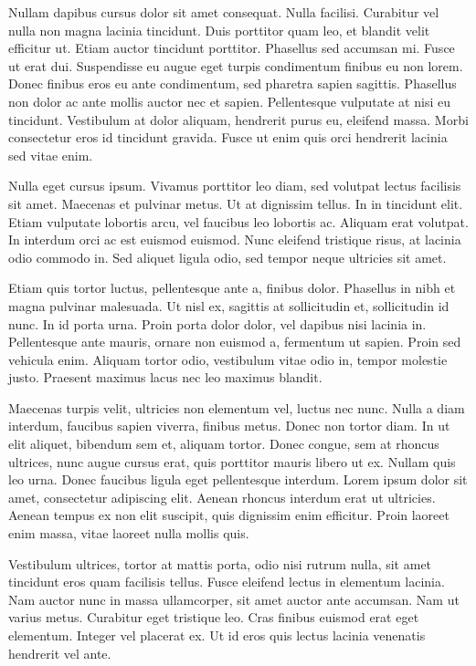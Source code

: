 \documentclass[
  letterpaper,
]{scrbook}
\begin{document}
Nullam dapibus cursus dolor sit amet consequat. Nulla facilisi.
Curabitur vel nulla non magna lacinia tincidunt. Duis porttitor quam
leo, et blandit velit efficitur ut. Etiam auctor tincidunt porttitor.
Phasellus sed accumsan mi. Fusce ut erat dui. Suspendisse eu augue eget
turpis condimentum finibus eu non lorem. Donec finibus eros eu ante
condimentum, sed pharetra sapien sagittis. Phasellus non dolor ac ante
mollis auctor nec et sapien. Pellentesque vulputate at nisi eu
tincidunt. Vestibulum at dolor aliquam, hendrerit purus eu, eleifend
massa. Morbi consectetur eros id tincidunt gravida. Fusce ut enim quis
orci hendrerit lacinia sed vitae enim.

Nulla eget cursus ipsum. Vivamus porttitor leo diam, sed volutpat lectus
facilisis sit amet. Maecenas et pulvinar metus. Ut at dignissim tellus.
In in tincidunt elit. Etiam vulputate lobortis arcu, vel faucibus leo
lobortis ac. Aliquam erat volutpat. In interdum orci ac est euismod
euismod. Nunc eleifend tristique risus, at lacinia odio commodo in. Sed
aliquet ligula odio, sed tempor neque ultricies sit amet.

Etiam quis tortor luctus, pellentesque ante a, finibus dolor. Phasellus
in nibh et magna pulvinar malesuada. Ut nisl ex, sagittis at
sollicitudin et, sollicitudin id nunc. In id porta urna. Proin porta
dolor dolor, vel dapibus nisi lacinia in. Pellentesque ante mauris,
ornare non euismod a, fermentum ut sapien. Proin sed vehicula enim.
Aliquam tortor odio, vestibulum vitae odio in, tempor molestie justo.
Praesent maximus lacus nec leo maximus blandit.

Maecenas turpis velit, ultricies non elementum vel, luctus nec nunc.
Nulla a diam interdum, faucibus sapien viverra, finibus metus. Donec non
tortor diam. In ut elit aliquet, bibendum sem et, aliquam tortor. Donec
congue, sem at rhoncus ultrices, nunc augue cursus erat, quis porttitor
mauris libero ut ex. Nullam quis leo urna. Donec faucibus ligula eget
pellentesque interdum. Lorem ipsum dolor sit amet, consectetur
adipiscing elit. Aenean rhoncus interdum erat ut ultricies. Aenean
tempus ex non elit suscipit, quis dignissim enim efficitur. Proin
laoreet enim massa, vitae laoreet nulla mollis quis.

Vestibulum ultrices, tortor at mattis porta, odio nisi rutrum nulla, sit
amet tincidunt eros quam facilisis tellus. Fusce eleifend lectus in
elementum lacinia. Nam auctor nunc in massa ullamcorper, sit amet auctor
ante accumsan. Nam ut varius metus. Curabitur eget tristique leo. Cras
finibus euismod erat eget elementum. Integer vel placerat ex. Ut id eros
quis lectus lacinia venenatis hendrerit vel ante.
\end{document}
